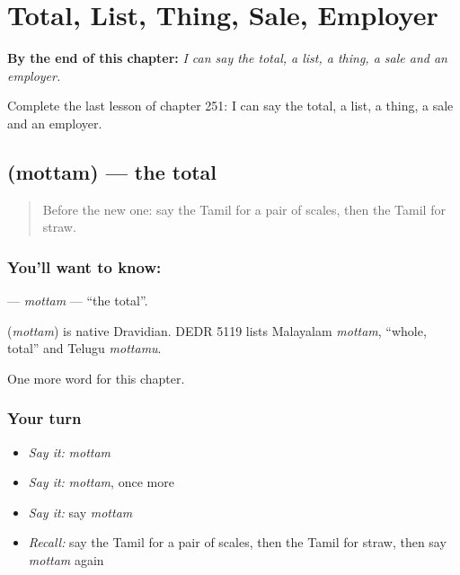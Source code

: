 
\chapter{Total, List, Thing, Sale, Employer}
\label{ch:ta-total-list-thing-sale-employer}

\begin{chapteropening}
\textbf{By the end of this chapter:} \emph{I can say the total, a list, a thing, a sale and an employer.}

Complete the last lesson of chapter 251: I can say the total, a list, a thing, a sale and an employer.
\end{chapteropening}

\section[\texorpdfstring{\ta{மொத்தம்} (mottam)}{மொத்தம் (mottam)}]{ (mottam) — the total}

\label{lesson:TA-C251-mottam}



\begin{quote}
Before the new one: say the Tamil for a pair of scales, then the Tamil for straw.
\end{quote}

\subsection*{You'll want to know: }
\textbf{} — \emph{mottam} — \textquotedblleft{}the total\textquotedblright{}.

\begin{cousinweb}
\textbf{} (\emph{mottam}) is native Dravidian. DEDR 5119 lists Malayalam \emph{mottam}, \textquotedblleft{}whole, total\textquotedblright{} and Telugu \emph{mottamu}.
\end{cousinweb}

\begin{grammarlens}[title={What you've built}]
One more word for this chapter.
\end{grammarlens}

\subsection*{Your turn}
\begin{itemize}
\raggedright
  \item \emph{Say it:} \emph{mottam}
  \item \emph{Say it:} \emph{mottam}, once more
  \item \emph{Say it:} say \emph{mottam}
  \item \emph{Recall:} say the Tamil for a pair of scales, then the Tamil for straw, then say \emph{mottam} again
\end{itemize}

